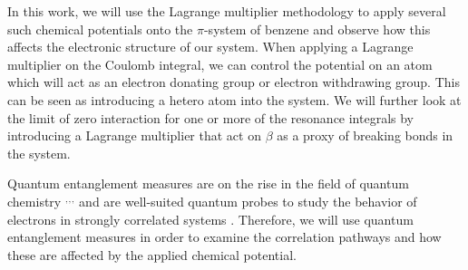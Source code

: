 \documentclass[twoside,twocolumn,9pt]{article}
\begin{document}
In this work, we will use the Lagrange multiplier methodology to apply several such chemical potentials onto the $\pi$-system of benzene and observe how this affects the electronic structure of our system. When applying a Lagrange multiplier on the Coulomb integral, we can control the potential on an atom which will act as an electron donating group or electron withdrawing group. This can be seen as introducing a hetero atom into the system. We will further look at the limit of zero interaction for one or more of the resonance integrals by introducing a Lagrange multiplier that act on $\beta$ as a proxy of breaking bonds in the system. 


Quantum entanglement measures are on the rise in the field of quantum chemistry \cite{DeVriendt2022}$^,$\cite{Daria1}$^,$\cite{Pendas}$^,$\cite{tubman2014quantum} and are well-suited quantum probes to study the behavior of electrons in strongly correlated systems \cite{LAFLORENCIE20161}. Therefore, we will use quantum entanglement measures in order to examine the correlation pathways and how these are affected by the applied chemical potential.
  
\end{document}

